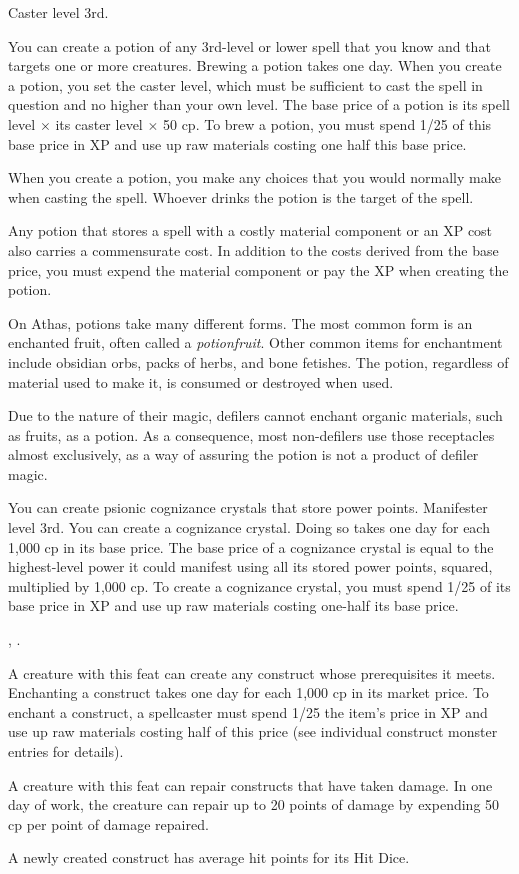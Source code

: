
{}
{Caster level 3rd.}
{You can create a potion of any 3rd-level or lower spell that you know and that targets one or more creatures. Brewing a potion takes one day. When you create a potion, you set the caster level, which must be sufficient to cast the spell in question and no higher than your own level. The base price of a potion is its spell level $\times$ its caster level $\times$ 50 cp. To brew a potion, you must spend 1/25 of this base price in XP and use up raw materials costing one half this base price.

When you create a potion, you make any choices that you would normally make when casting the spell. Whoever drinks the potion is the target of the spell.

Any potion that stores a spell with a costly material component or an XP cost also carries a commensurate cost. In addition to the costs derived from the base price, you must expend the material component or pay the XP when creating the potion.}
{}
{On Athas, potions take many different forms. The most common form is an enchanted fruit, often called a \emph{potionfruit}. Other common items for enchantment include obsidian orbs, packs of herbs, and bone fetishes. The potion, regardless of material used to make it, is consumed or destroyed when used.

Due to the nature of their magic, defilers cannot enchant organic materials, such as fruits, as a potion. As a consequence, most non-defilers use those receptacles almost exclusively, as a way of assuring the potion is not a product of defiler magic.}

{You can create psionic cognizance crystals that store power points.}
{Manifester level 3rd.}
{You can create a cognizance crystal. Doing so takes one day for each 1,000 cp in its base price. The base price of a cognizance crystal is equal to the highest-level power it could manifest using all its stored power points, squared, multiplied by 1,000 cp. To create a cognizance crystal, you must spend 1/25 of its base price in XP and use up raw materials costing one-half its base price.}{}{}

{, .}
{A creature with this feat can create any construct whose prerequisites it meets. Enchanting a construct takes one day for each 1,000 cp in its market price. To enchant a construct, a spellcaster must spend 1/25 the item's price in XP and use up raw materials costing half of this price (see individual construct monster entries for details).

A creature with this feat can repair constructs that have taken damage. In one day of work, the creature can repair up to 20 points of damage by expending 50 cp per point of damage repaired.

A newly created construct has average hit points for its Hit Dice.}


